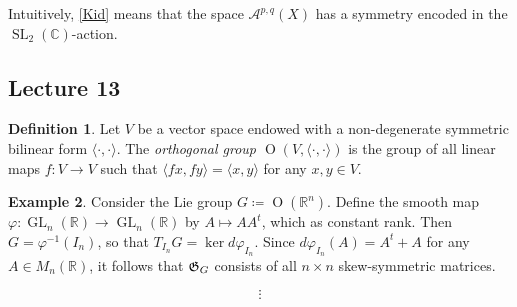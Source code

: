 \documentclass[10pt,letterpaper,cm]{nupset}
\theoremstyle{definition}
\newtheorem{defn}{Definition}[subsection]
\newtheorem{exmp}[defn]{Example}
\theoremstyle{theorem}
\theoremstyle{remark}
\newcommand{\A}{\mathcal A}
\newcommand{\C}{\mathbb C}
\newcommand{\G}{\frak{G}}
\newcommand{\R}{\mathbb{R}}
\newcommand{\1}{\mathbb{1}}
\newcommand{\0}{\vec 0}
\DeclareMathOperator{\GL}{GL}
\DeclareMathOperator{\SL}{SL}
\DeclareMathOperator{\Or}{O}
\begin{document}
Intuitively, \cref{Kid} means that the space $\A^{p,q}\left(X\right)$ has a symmetry encoded in the $\SL_2\left(\C\right)$-action.  

\subsection{Lecture 13}

\begin{defn}
Let $V$ be a vector space endowed with a non-degenerate symmetric bilinear form $\langle \cdot , \cdot \rangle$. The \textit{orthogonal group $\Or\left(V, \langle \cdot , \cdot \rangle\right)$} is the group of all linear maps $f : V \to V$ such that $\langle f{x}, f{y}\rangle = \langle x,y\rangle$ for any $x,y\in V$.
\end{defn}

\begin{exmp}
Consider the Lie group $G \coloneqq \Or(\R^n)$. Define the smooth map $\varphi : \GL_n(\R) \to \GL_n(\R)$ by $A\mapsto AA^t$, which as constant rank.  Then $G = \varphi^{-1}(I_n)$, so that $T_{I_n}{G} = \ker{d{\varphi}_{I_n}}$. Since $d{\varphi}_{I_n}(A) = A^t + A$ for any $A \in M_n(\R)$, it follows that $\G_G$ consists of all $n\times n$ skew-symmetric matrices. 
\end{exmp}

\[
\vdots
\]
\end{document}
